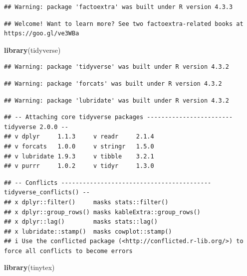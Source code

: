 \documentclass[
]{article}
\newenvironment{Shaded}{\begin{snugshade}}{\end{snugshade}}
\newcommand{\FunctionTok}[1]{\textcolor[rgb]{0.13,0.29,0.53}{\textbf{#1}}}
\newcommand{\NormalTok}[1]{#1}
\begin{document}
\begin{verbatim}
## Warning: package 'factoextra' was built under R version 4.3.3
\end{verbatim}

\begin{verbatim}
## Welcome! Want to learn more? See two factoextra-related books at https://goo.gl/ve3WBa
\end{verbatim}

\begin{Shaded}
\begin{Highlighting}[]
\FunctionTok{library}\NormalTok{(tidyverse)}
\end{Highlighting}
\end{Shaded}

\begin{verbatim}
## Warning: package 'tidyverse' was built under R version 4.3.2
\end{verbatim}

\begin{verbatim}
## Warning: package 'forcats' was built under R version 4.3.2
\end{verbatim}

\begin{verbatim}
## Warning: package 'lubridate' was built under R version 4.3.2
\end{verbatim}

\begin{verbatim}
## -- Attaching core tidyverse packages ------------------------ tidyverse 2.0.0 --
## v dplyr     1.1.3     v readr     2.1.4
## v forcats   1.0.0     v stringr   1.5.0
## v lubridate 1.9.3     v tibble    3.2.1
## v purrr     1.0.2     v tidyr     1.3.0
\end{verbatim}

\begin{verbatim}
## -- Conflicts ------------------------------------------ tidyverse_conflicts() --
## x dplyr::filter()     masks stats::filter()
## x dplyr::group_rows() masks kableExtra::group_rows()
## x dplyr::lag()        masks stats::lag()
## x lubridate::stamp()  masks cowplot::stamp()
## i Use the conflicted package (<http://conflicted.r-lib.org/>) to force all conflicts to become errors
\end{verbatim}

\begin{Shaded}
\begin{Highlighting}[]
\FunctionTok{library}\NormalTok{(tinytex)}
\end{Highlighting}
\end{Shaded}
\end{document}
